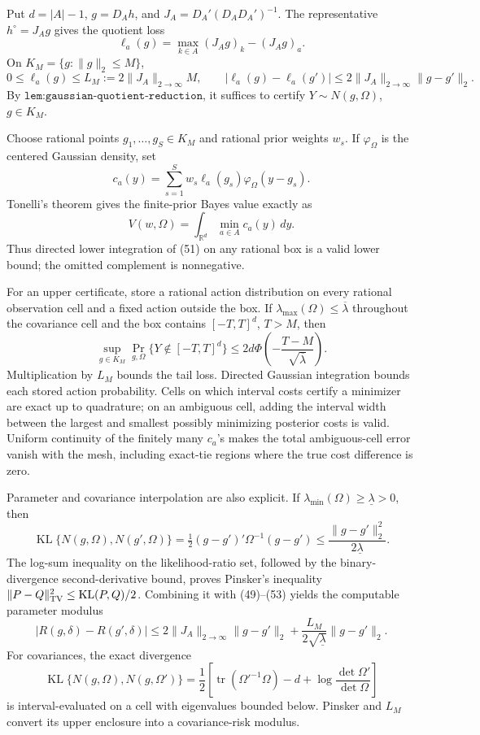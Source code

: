 Put \(d=|A|-1\), \(g=D_Ah\), and \(J_A=D_A'(D_AD_A')^{-1}\).  The representative \(h^\circ=J_Ag\) gives the quotient loss
\[
\ell_a(g)=\max_{k\in A}(J_Ag)_k-(J_Ag)_a.
\]
On \(K_M=\{g:\|g\|_2\leq M\}\),
\[
0\leq\ell_a(g)\leq L_M:=2\|J_A\|_{2\to\infty}M,\qquad
|\ell_a(g)-\ell_a(g')|\leq2\|J_A\|_{2\to\infty}\|g-g'\|_2. \tag{49}
\]
By \(\texttt{lem:gaussian-quotient-reduction}\), it suffices to certify \(Y\sim N(g,\Omega)\), \(g\in K_M\).

Choose rational points \(g_1,\ldots,g_S\in K_M\) and rational prior weights \(w_s\).  If \(\varphi_\Omega\) is the centered Gaussian density, set
\[
c_a(y)=\sum_{s=1}^Sw_s\ell_a(g_s)\varphi_\Omega(y-g_s). \tag{50}
\]
Tonelli's theorem gives the finite-prior Bayes value exactly as
\[
V(w,\Omega)=\int_{\mathbb R^d}\min_{a\in A}c_a(y)\,dy. \tag{51}
\]
Thus directed lower integration of (51) on any rational box is a valid lower bound; the omitted complement is nonnegative.

For an upper certificate, store a rational action distribution on every rational observation cell and a fixed action outside the box.  If \(\lambda_{\max}(\Omega)\leq\overline\lambda\) throughout the covariance cell and the box contains \([-T,T]^d\), \(T>M\), then
\[
\sup_{g\in K_M}\Pr_{g,\Omega}\{Y\notin[-T,T]^d\}
\leq2d\Phi\!\left(-\frac{T-M}{\sqrt{\overline\lambda}}\right). \tag{52}
\]
Multiplication by \(L_M\) bounds the tail loss.  Directed Gaussian integration bounds each stored action probability.  Cells on which interval costs certify a minimizer are exact up to quadrature; on an ambiguous cell, adding the interval width between the largest and smallest possibly minimizing posterior costs is valid.  Uniform continuity of the finitely many \(c_a\)'s makes the total ambiguous-cell error vanish with the mesh, including exact-tie regions where the true cost difference is zero.

Parameter and covariance interpolation are also explicit.  If \(\lambda_{\min}(\Omega)\geq\underline\lambda>0\), then
\[
\operatorname{KL}\{N(g,\Omega),N(g',\Omega)\}
=\tfrac12(g-g')'\Omega^{-1}(g-g')
\leq\frac{\|g-g'\|_2^2}{2\underline\lambda}. \tag{53}
\]
The log-sum inequality on the likelihood-ratio set, followed by the binary-divergence second-derivative bound, proves Pinsker's inequality \(\|P-Q\|_{\rm TV}^2\leq\operatorname{KL}(P,Q)/2\).  Combining it with (49)--(53) yields the computable parameter modulus
\[
|R(g,\delta)-R(g',\delta)|
\leq2\|J_A\|_{2\to\infty}\|g-g'\|_2
+\frac{L_M}{2\sqrt{\underline\lambda}}\|g-g'\|_2. \tag{54}
\]
For covariances, the exact divergence
\[
\operatorname{KL}\{N(g,\Omega),N(g,\Omega')\}
=\frac12\left[\operatorname{tr}(\Omega'^{-1}\Omega)-d+
\log\frac{\det\Omega'}{\det\Omega}\right] \tag{55}
\]
is interval-evaluated on a cell with eigenvalues bounded below.  Pinsker and \(L_M\) convert its upper enclosure into a covariance-risk modulus.

